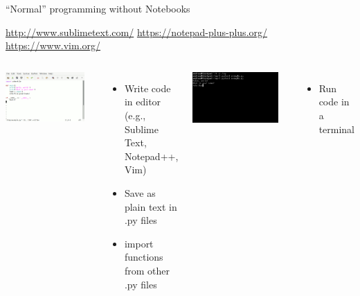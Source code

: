 \documentclass[aspectratio=169,usenames,dvipsnames]{beamer}
\begin{document}
\begin{frame}{``Normal'' programming without Notebooks}
    \begin{reference}
        \url{http://www.sublimetext.com/}
        \url{https://notepad-plus-plus.org/}
        \url{https://www.vim.org/}
    \end{reference}
    \begin{columns}[T]
            \includegraphics[width=0.9\textwidth]{fig/editor}
            \begin{itemize}
                \item Write code in editor (e.g., Sublime Text, Notepad++, Vim)
                \item Save as plain text in .py files
                \item import functions from other .py files
            \end{itemize}
        \pause
            \includegraphics[width=0.9\textwidth]{fig/terminal}
            \begin{itemize}
                \item Run code in a terminal
            \end{itemize}
    \end{columns}
\end{frame}
\end{document}
